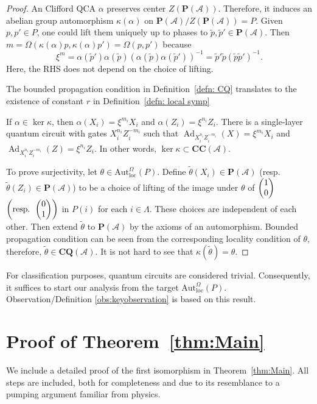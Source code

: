 \documentclass{article}
\theoremstyle{definition}
\newcommand*\colvec[3][]{
    \begin{pmatrix}\ifx\relax#1\relax\else#1\\\fi#2\\#3\end{pmatrix}
}
\DeclareMathOperator{\Ad}{Ad}
\newcommand{\SA}{{\mathscr A}}
\def \al {\alpha}
\begin{document}
\begin{proof}
An Clifford QCA $\alpha$ preserves center $Z(\mathbf P(\SA))$. Therefore, it induces an abelian group automorphism $\kappa(\alpha)$ on $\mathbf P(\SA)/Z(\mathbf P(\SA))=P$. Given $p, p'\in P$, one could lift them uniquely up to phases to $\tilde p, \tilde p' \in \mathbf P(\SA)$. Then $m=\Omega(\kappa(\alpha) p, \kappa(\alpha) p')=\Omega( p, p')$ because  
$$\xi^m =\al (\tilde p')\al (\tilde p)(\al (\tilde p)\al (\tilde p') )^{-1}=\tilde p' \tilde p (\tilde p \tilde p')^{-1}.$$ 
Here, the RHS does not depend on the choice of lifting. 


The bounded propagation condition in Definition~\ref{defn: CQ} translates to the existence of constant $r$ in Definition~\ref{defn: local symp}

If $\alpha\in \ker \kappa$, then $\alpha(X_i)=\xi^{m_i}X_i$ and $\alpha(Z_i)=\xi^{n_i}Z_i$. There is a single-layer quantum circuit with gates $X_i^{n_i}Z_i^{-m_i}$ such that $\Ad_{X_i^{n_i}Z_i^{-m_i}}(X)=\xi^{m_i}X_i$ and $\Ad_{X_i^{n_i}Z_i^{-m_i}}(Z)=\xi^{n_i}Z_i.$ In other words, $\ker \kappa\subset \mathbf{CC}(\SA)$. 

To prove surjectivity, let $\theta \in \mathrm{Aut}_{\mathrm{loc}}^{\Omega}(P)$. Define $\tilde \theta (X_i)\in \mathbf P(\SA)$ (resp. $ \tilde \theta (Z_i) \in \mathbf P(\SA)$) to be a choice of lifting of the image under $\theta$ of $\colvec{1}{0}$ $\left( \text{resp. } \colvec{0}{1}\right)$ in $P(i)$ for each $i\in \Lambda$. These choices are independent of each other. Then extend $\tilde \theta$ to $\mathbf P(\SA)$ by the axioms of an automorphism. Bounded propagation condition can be seen from the corresponding locality condition of $\theta,$ therefore, $\tilde \theta\in \mathbf{CQ}(\SA)$. It is not hard to see that $\kappa(\tilde \theta)=\theta$.
\end{proof}

For classification purposes, quantum circuits are considered trivial. Consequently, it suffices to start our analysis from the target $\mathrm{Aut}_{\mathrm{loc}}^{\Omega}(P)$. Observation/Definition \ref{obs:keyobservation} is based on this result.


 \section{Proof of Theorem~\ref{thm:Main}}
We include a detailed proof of the first isomorphism in Theorem~\ref{thm:Main}. All steps are included, both for completeness and due to its resemblance to a pumping argument familiar from physics.
\end{document}
